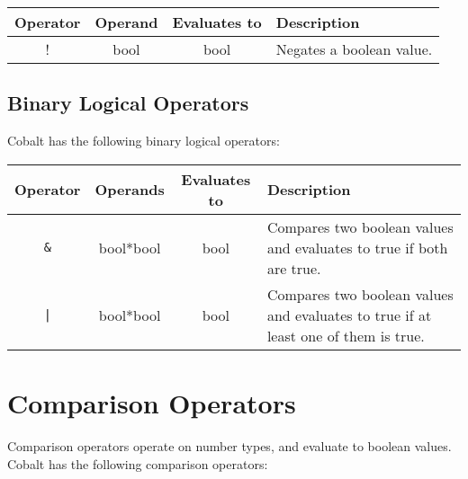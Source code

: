 \documentclass[a4paper,appendixprefix]{scrreprt}
\begin{document}
\begin{center}
  \begin{tabularx}{\textwidth}{|c|c|c|X|}
    \hline
    \textbf{Operator} & \textbf{Operand} & \textbf{Evaluates to} & \textbf{Description} \\ \hline
    ! & bool & bool & Negates a boolean value. \\ \hline
  \end{tabularx}
\end{center}


\subsection{Binary Logical Operators}
Cobalt has the following binary logical operators:

\begin{center}
  \begin{tabularx}{\textwidth}{|c|c|c|X|}
    \hline
    \textbf{Operator} & \textbf{Operands} & \textbf{Evaluates to} & \textbf{Description} \\ \hline
    \verb|&| & bool*bool & bool & Compares two boolean values and evaluates to true if both are true. \\ \hline
    \texttt{|} & bool*bool & bool & Compares two boolean values and evaluates to true if at least one of them is true. \\ \hline
  \end{tabularx}
\end{center}

\pagebreak

\section{Comparison Operators}
Comparison operators operate on number types, and evaluate to boolean values. Cobalt has the following comparison operators:
\end{document}
